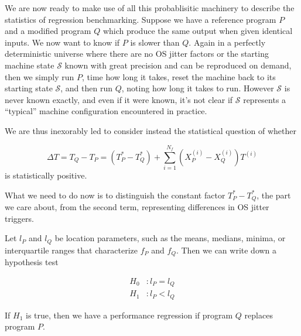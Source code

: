 \documentclass[conference]{IEEEtran}
\begin{document}
We are now ready to make use of all this probablisitic machinery to describe the statistics of regression benchmarking. Suppose we have a reference program $P$ and a modified program $Q$ which produce the same output when given identical inputs. We now want to know if $P$ is slower than $Q$. Again in a perfectly deterministic universe where there are no OS jitter factors or the starting machine state $\mathcal S$ known with great precision and can be reproduced on demand, then we simply run $P$, time how long it takes, reset the machine back to its starting state $\mathcal S$, and then run $Q$, noting how long it takes to run. However $\mathcal S$ is never known exactly, and even if it were known, it's not clear if
$\mathcal S$ represents a ``typical'' machine configuration encountered in practice.

We are thus inexorably led to consider instead the statistical question of whether

\begin{equation}
\Delta T = T_Q - T_P
= (T^*_P - T^*_Q) + \sum_{i=1}^{N_f} (X^{(i)}_P - X^{(i)}_Q) T^{(i)}
\end{equation}
%
is statistically positive.

What we need to do now is to distinguish the constant factor $T^*_P - T^*_Q$, the part we care about, from the second term, representing differences in OS jitter triggers.


Let $l_P$ and $l_Q$ be location parameters, such as the means, medians, minima, or interquartile ranges that characterize $f_P$ and $f_Q$. Then we can write down a hypothesis test

\begin{subequations}
\begin{align}
H_0&: l_P = l_Q \\
H_1&: l_P < l_Q
\end{align}
\end{subequations}

If $H_1$ is true, then we have a performance regression if program $Q$ replaces program $P$.
\end{document}
